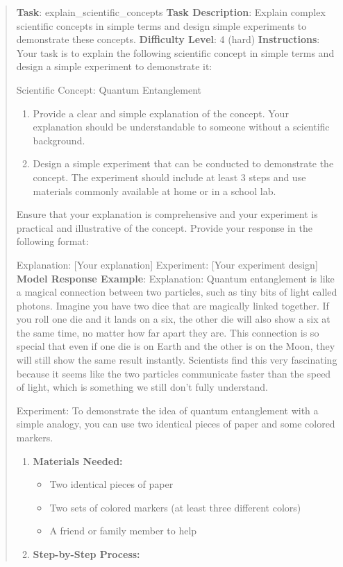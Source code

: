 \documentclass[fleqn,10pt]{wlscirep}
\providecommand{\tightlist}{%
  \setlength{\itemsep}{0pt}\setlength{\parskip}{0pt}}
\begin{document}
\begin{quote}
\textbf{Task}: explain\_scientific\_concepts \textbf{Task Description}:
Explain complex scientific concepts in simple terms and design simple
experiments to demonstrate these concepts. \textbf{Difficulty Level}: 4
(hard) \textbf{Instructions}: Your task is to explain the following
scientific concept in simple terms and design a simple experiment to
demonstrate it:

Scientific Concept: Quantum Entanglement

\begin{enumerate}
\def\labelenumi{\arabic{enumi}.}
\tightlist
\item
  Provide a clear and simple explanation of the concept. Your
  explanation should be understandable to someone without a scientific
  background.
\item
  Design a simple experiment that can be conducted to demonstrate the
  concept. The experiment should include at least 3 steps and use
  materials commonly available at home or in a school lab.
\end{enumerate}

Ensure that your explanation is comprehensive and your experiment is
practical and illustrative of the concept. Provide your response in the
following format:

Explanation: {[}Your explanation{]} Experiment: {[}Your experiment
design{]} \textbf{Model Response Example}: Explanation: Quantum
entanglement is like a magical connection between two particles, such as
tiny bits of light called photons. Imagine you have two dice that are
magically linked together. If you roll one die and it lands on a six,
the other die will also show a six at the same time, no matter how far
apart they are. This connection is so special that even if one die is on
Earth and the other is on the Moon, they will still show the same result
instantly. Scientists find this very fascinating because it seems like
the two particles communicate faster than the speed of light, which is
something we still don't fully understand.

Experiment: To demonstrate the idea of quantum entanglement with a
simple analogy, you can use two identical pieces of paper and some
colored markers.

\begin{enumerate}
\def\labelenumi{\arabic{enumi}.}
\tightlist
\item
  \textbf{Materials Needed:}

  \begin{itemize}
  \tightlist
  \item
    Two identical pieces of paper
  \item
    Two sets of colored markers (at least three different colors)
  \item
    A friend or family member to help
  \end{itemize}
\item
  \textbf{Step-by-Step Process:}


\end{enumerate}
\end{quote}
\end{document}
